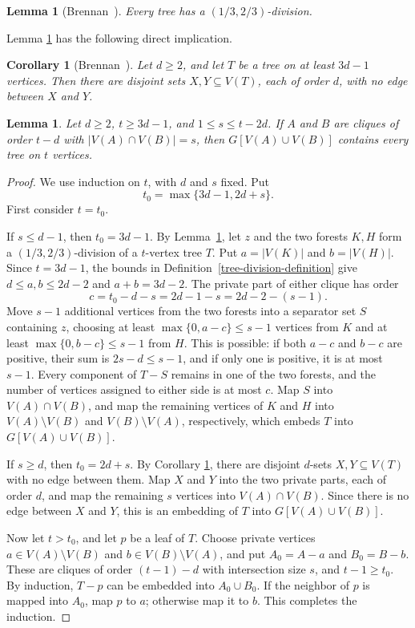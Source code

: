 \documentclass[11pt,a4paper]{article}
\newtheorem{lemma}[theorem]{Lemma}
\newtheorem{corollary}[theorem]{Corollary}
\begin{document}
\begin{lemma}[Brennan~\cite{Brennan2016,Brennan2017}]\label{tree-division}
Every tree has a \((1/3,2/3)\)-division.
\end{lemma}

Lemma \ref{tree-division} has the following  direct implication.
\begin{corollary}[Brennan~\cite{Brennan2016,Brennan2017}]\label{separation}
Let \(d\ge2\), and let \(T\) be a tree on at least \(3d-1\) vertices. Then there are disjoint sets \(X,Y\subseteq V(T)\), each of order \(d\), with no edge between \(X\) and \(Y\).
\end{corollary}


\begin{lemma}\label{two-clique}
Let \(d\ge2\), \(t\ge3d-1\), and \(1\le s\le t-2d\). If \(A\) and \(B\) are cliques of order \(t-d\) with \(|V(A)\cap V(B)|=s\), then \(G[V(A)\cup V(B)]\) contains every tree on \(t\) vertices.
\end{lemma}

\begin{proof}
We use induction on \(t\), with \(d\) and \(s\) fixed. Put
\[
t_0=\max\{3d-1,2d+s\}.
\]
First consider \(t=t_0\).

If \(s\le d-1\), then \(t_0=3d-1\). By Lemma~\ref{tree-division}, let \(z\) and the two forests \(K,H\) form a \((1/3,2/3)\)-division of a $t$-vertex tree \(T\). Put \(a=|V(K)|\) and \(b=|V(H)|\). Since \(t=3d-1\), the bounds in Definition~\ref{tree-division-definition} give \(d\le a,b\le2d-2\) and \(a+b=3d-2\). The private part of either clique has order
\[
c=t_0-d-s=2d-1-s=2d-2-(s-1).
\]
Move \(s-1\) additional vertices from the two forests into a separator set \(S\) containing \(z\), choosing at least \(\max\{0,a-c\}\le s-1\) vertices from \(K\) and at least \(\max\{0,b-c\}\le s-1\) from \(H\). This is possible: if both $a-c$ and $b-c$ are positive, their sum is \(2s-d\le s-1\), and if only one is positive, it is at most \(s-1\). Every component of \(T-S\) remains in one of the two forests, and the number of vertices assigned to either side is at most \(c\). Map \(S\) into \(V(A)\cap V(B)\), and map the remaining vertices of \(K\) and \(H\) into \(V(A)\setminus V(B)\) and \(V(B)\setminus V(A)\), respectively, which embeds $T$ into \(G[V(A)\cup V(B)]\).

If \(s\ge d\), then \(t_0=2d+s\). By Corollary \ref{separation}, there are disjoint \(d\)-sets \(X,Y\subseteq V(T)\) with no edge between them. Map \(X\) and \(Y\) into the two private parts, each of order \(d\), and map the remaining \(s\) vertices into \(V(A)\cap V(B)\). Since there is no edge between \(X\) and \(Y\), this is an embedding of $T$ into \(G[V(A)\cup V(B)]\).

Now let \(t>t_0\), and let \(p\) be a leaf of \(T\). Choose private vertices \(a\in V(A)\setminus V(B)\) and \(b\in V(B)\setminus V(A)\), and put \(A_0=A-a\) and \(B_0=B-b\). These are cliques of order \((t-1)-d\) with intersection size \(s\), and \(t-1\ge t_0\). By induction, \(T-p\) can be embedded into \(A_0\cup B_0\). If the neighbor of \(p\) is mapped into \(A_0\), map \(p\) to \(a\); otherwise map it to \(b\). This completes the induction.
\end{proof}
\end{document}

